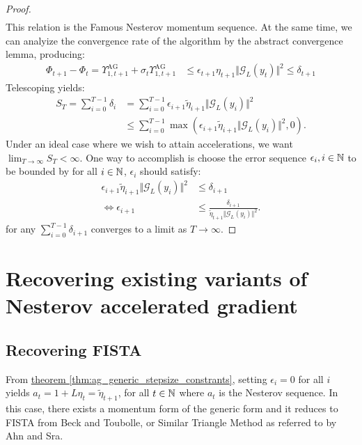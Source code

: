 \documentclass[12pt]{article}
\begin{document}
\begin{proof}
\begin{align*}
        \end{align*}
        This relation is the Famous Nesterov momentum sequence. 
        At the same time, we can analyize the convergence rate of the algorithm by the abstract convergence lemma, producing: 
        \begin{align*}
            \Phi_{t + 1} - \Phi_t =
            \Upsilon_{1, t + 1}^\text{AG} + 
            \sigma_t\Upsilon_{1, t + 1}^{\text{AG}} 
            &\le \epsilon_{t + 1}\eta_{t + 1} \Vert \mathcal G_L(y_t)\Vert^2 \le \delta_{t + 1}
        \end{align*}
        Telescoping yields: 
        \begin{align*}
            S_{T} = 
            \sum_{i = 0}^{T- 1} \delta_i 
            &= 
            \sum_{i = 0}^{T - 1} \epsilon_{i + 1}\tilde\eta_{i + 1}\Vert \mathcal G_L(y_i)\Vert^2
            \\
            &\le \sum_{i = 0}^{T - 1}\max(\epsilon_{i + 1} \tilde\eta_{i + 1}\Vert \mathcal G_L(y_i)\Vert^2, 0). 
        \end{align*}
        Under an ideal case where we wish to attain accelerations, we want $\lim_{T \rightarrow \infty} S_T < \infty$. 
        One way to accomplish is choose the error sequence $\epsilon_i, i \in \mathbb N$ to be bounded by for all $i \in \mathbb N$, $\epsilon_i$ should satisfy: 
        \begin{align*}
            \epsilon_{i + 1}\tilde \eta_{i + 1}
            \Vert \mathcal G_L(y_i)\Vert^2 
            &\le \delta_{i + 1}
            \\
            \iff 
            \epsilon_{i + 1}
            &\le 
            \frac{\delta_{i + 1} }{\tilde\eta_{t + 1}\Vert \mathcal G_L(y_i)\Vert^2}. 
        \end{align*}
        for any $\sum_{i = 0}^{T - 1}\delta_{i + 1}$ converges to a limit as $T \rightarrow \infty$. 

    \end{proof}

\section{Recovering existing variants of Nesterov accelerated gradient}\label{sec:recovery}
    \subsection{Recovering FISTA}
        From 
        \hyperref[thm:ag_generic_stepsize_constrants]{theorem \ref*{thm:ag_generic_stepsize_constrants}}, 
        setting $\epsilon_i = 0$ for all $i$ yields $a_t = 1 + L\eta_t = \tilde \eta_{t + 1}$, for all $t \in \mathbb N$ where $a_t$ is the Nesterov sequence.
        In this case, there exists a momentum form of the generic form and it reduces to FISTA from Beck and Toubolle, or Similar Triangle Method as referred to by Ahn and Sra. 
        
\end{document}
